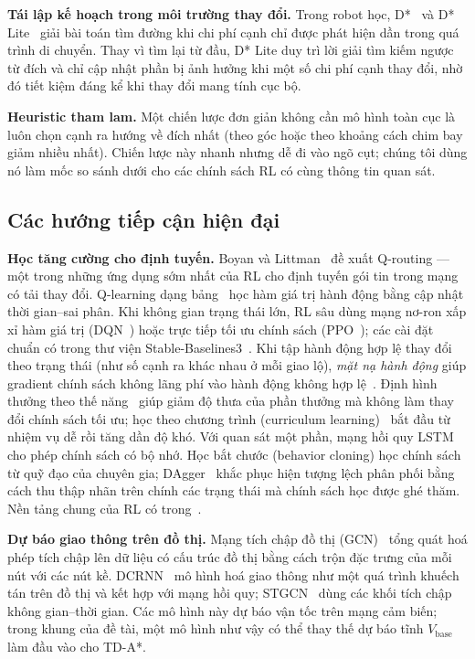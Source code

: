 \textbf{Tái lập kế hoạch trong môi trường thay đổi.} Trong robot học, D*~\cite{stentz1994} và D* Lite~\cite{koenig2002}
giải bài toán tìm đường khi chi phí cạnh chỉ được phát hiện dần trong quá trình di chuyển. Thay vì tìm lại từ đầu, D*
Lite duy trì lời giải tìm kiếm ngược từ đích và chỉ cập nhật phần bị ảnh hưởng khi một số chi phí cạnh thay đổi, nhờ đó
tiết kiệm đáng kể khi thay đổi mang tính cục bộ.

\textbf{Heuristic tham lam.} Một chiến lược đơn giản không cần mô hình toàn cục là luôn chọn cạnh ra hướng về đích
nhất (theo góc hoặc theo khoảng cách chim bay giảm nhiều nhất). Chiến lược này nhanh nhưng dễ đi vào ngõ cụt; chúng tôi
dùng nó làm mốc so sánh dưới cho các chính sách RL có cùng thông tin quan sát.

\subsection{Các hướng tiếp cận hiện đại}\label{sec:related:modern}

\textbf{Học tăng cường cho định tuyến.} Boyan và Littman~\cite{boyan1994} đề xuất Q-routing --- một trong những ứng dụng
sớm nhất của RL cho định tuyến gói tin trong mạng có tải thay đổi. Q-learning dạng bảng~\cite{watkins1992} học hàm giá
trị hành động bằng cập nhật thời gian--sai phân. Khi không gian trạng thái lớn, RL sâu dùng mạng nơ-ron xấp xỉ hàm giá
trị (DQN~\cite{mnih2015}) hoặc trực tiếp tối ưu chính sách (PPO~\cite{schulman2017}); các cài đặt chuẩn có trong thư viện
Stable-Baselines3~\cite{raffin2021}. Khi tập hành động hợp lệ thay đổi theo trạng thái (như số cạnh ra khác nhau ở mỗi
giao lộ), \emph{mặt nạ hành động} giúp gradient chính sách không lãng phí vào hành động không hợp lệ~\cite{huang2022}.
Định hình thưởng theo thế năng~\cite{ng1999} giúp giảm độ thưa của phần thưởng mà không làm thay đổi chính sách tối ưu;
học theo chương trình (curriculum learning)~\cite{bengio2009} bắt đầu từ nhiệm vụ dễ rồi tăng dần độ khó. Với quan sát
một phần, mạng hồi quy LSTM~\cite{hochreiter1997lstm} cho phép chính sách có bộ nhớ. Học bắt chước (behavior cloning) học
chính sách từ quỹ đạo của chuyên gia; DAgger~\cite{ross2011dagger} khắc phục hiện tượng lệch phân phối bằng cách thu
thập nhãn trên chính các trạng thái mà chính sách học được ghé thăm. Nền tảng chung của RL có trong~\cite{sutton2018}.

\textbf{Dự báo giao thông trên đồ thị.} Mạng tích chập đồ thị (GCN)~\cite{kipf2017gcn} tổng quát hoá phép tích chập lên
dữ liệu có cấu trúc đồ thị bằng cách trộn đặc trưng của mỗi nút với các nút kề. DCRNN~\cite{li2018dcrnn} mô hình hoá giao
thông như một quá trình khuếch tán trên đồ thị và kết hợp với mạng hồi quy; STGCN~\cite{yu2018stgcn} dùng các khối tích
chập không gian--thời gian. Các mô hình này dự báo vận tốc trên mạng cảm biến; trong khung của đề tài, một mô hình như
vậy có thể thay thế dự báo tĩnh $V_{\text{base}}$ làm đầu vào cho TD-A*.

